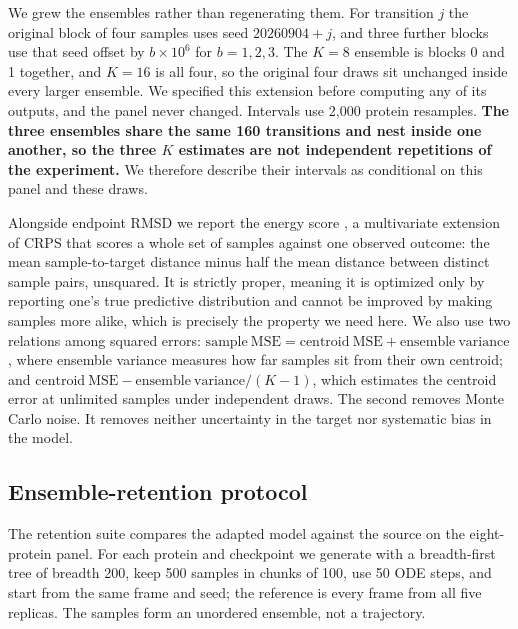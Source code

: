 \documentclass{article}
\begin{document}
We grew the ensembles rather than regenerating them. For transition $j$ the original block of four samples uses seed $20260904+j$, and three further blocks use that seed offset by $b\times10^{6}$ for $b=1,2,3$. The $K=8$ ensemble is blocks 0 and 1 together, and $K=16$ is all four, so the original four draws sit unchanged inside every larger ensemble. We specified this extension before computing any of its outputs, and the panel never changed. Intervals use 2{,}000 protein resamples. \textbf{The three ensembles share the same 160 transitions and nest inside one another, so the three $K$ estimates are not independent repetitions of the experiment.} We therefore describe their intervals as conditional on this panel and these draws.

Alongside endpoint RMSD we report the energy score \citep{gneiting2007proper,gneiting2008assessing}, a multivariate extension of CRPS that scores a whole set of samples against one observed outcome: the mean sample-to-target distance minus half the mean distance between distinct sample pairs, unsquared. It is strictly proper, meaning it is optimized only by reporting one's true predictive distribution and cannot be improved by making samples more alike, which is precisely the property we need here. We also use two relations among squared errors: $\mathrm{sample\ MSE} = \mathrm{centroid\ MSE} + \mathrm{ensemble\ variance}$, where ensemble variance measures how far samples sit from their own centroid; and $\mathrm{centroid\ MSE} - \mathrm{ensemble\ variance}/(K-1)$, which estimates the centroid error at unlimited samples under independent draws. The second removes Monte Carlo noise. It removes neither uncertainty in the target nor systematic bias in the model.

\subsection{Ensemble-retention protocol}

The retention suite compares the adapted model against the source on the eight-protein panel. For each protein and checkpoint we generate with a breadth-first tree of breadth 200, keep 500 samples in chunks of 100, use 50 ODE steps, and start from the same frame and seed; the reference is every frame from all five replicas. The samples form an unordered ensemble, not a trajectory.
\end{document}

